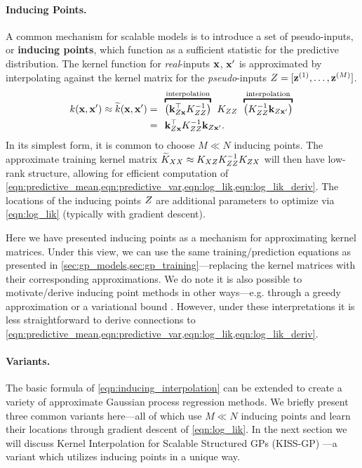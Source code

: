 \paragraph{Inducing Points.}
A common mechanism for scalable models is to introduce a set of pseudo-inputs, or {\bf inducing points}, which function as a sufficient statistic for the predictive distribution.
The kernel function for \emph{real}-inputs $\mathbf{x}$, $\mathbf{x}'$ is approximated by interpolating against the kernel matrix for the \emph{pseudo}-inputs $Z = [\mathbf{z}^{(1)}, \ldots, \mathbf{z}^{(M)}]$.
%
\begin{align}
  k(\bx, \bx') \approx \widetilde k(\bx, \bx') &= \:\:
		\overbracket{ \left( \bk_{\bZ\bx}^\top \bK_{\bZ\bZ}^{-1} \right) }^{\text{interpolation}} \:\: \bK_{\bZ\bZ} \:\:
		\overbracket{ \left( \bK_{\bZ\bZ}^{-1} \bk_{\bZ\bx'} 		 \right) }^{\text{interpolation}}
	\nonumber{} \\
	&= \:\:
	\bk_{\bZ\bx}^\top \bK_{\bZ\bZ}^{-1} \bk_{\bZ\bx'}.
	\label{eqn:inducing_interpolation}
\end{align}
%
In its simplest form, it is common to choose $M \ll N$ inducing points.
The approximate training kernel matrix $\widetilde {K}_{XX} \approx K_{XZ} K_{ZZ}^{-1} K_{ZX}$ will then have low-rank structure, allowing for efficient computation of \cref{eqn:predictive_mean,eqn:predictive_var,eqn:log_lik,eqn:log_lik_deriv}.
The locations of the inducing points $Z$ are additional parameters to optimize via \cref{eqn:log_lik} (typically with gradient descent).

Here we have presented inducing points as a mechanism for approximating kernel matrices.
Under this view, we can use the same training/prediction equations as presented in \cref{sec:gp_models,sec:gp_training}---replacing the kernel matrices with their corresponding approximations.
We do note it is also possible to motivate/derive inducing point methods in other ways---e.g. through a greedy approximation \cite{smola2001sparse} or a variational bound \cite{titsias2009variational,hensman2013gaussian}.
However, under these interpretations it is less straightforward to derive connections to \cref{eqn:predictive_mean,eqn:predictive_var,eqn:log_lik,eqn:log_lik_deriv}.

\paragraph{Variants.}
The basic formula of \cref{eqn:inducing_interpolation} can be extended to create a variety of approximate Gaussian process regression methods.
We briefly present three common variants here---all of which use $M \ll N$ inducing points and learn their locations through gradient descent of \cref{eqn:log_lik}.
In the next section we will discuss Kernel Interpolation for Scalable Structured GPs (KISS-GP) \cite{wilson2015kernel}---a variant which utilizes inducing points in a unique way.

